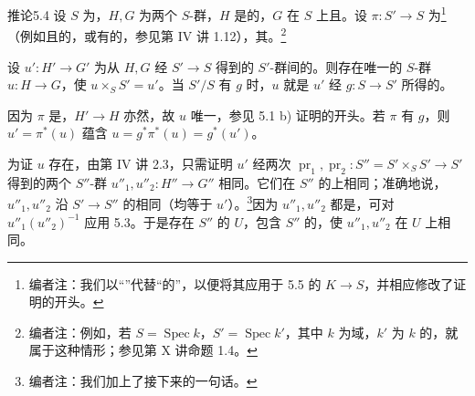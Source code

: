 \begin{SGAresult}{推论}{5.4}
设 $S$ 为，$H,G$ 为两个 $S$-群，$H$ 是的，$G$ 在 $S$ 上且。设 $\pi:S'\to S$ 为\footnote{编者注：我们以“”代替“的”，以便将其应用于 5.5 的 $K\to S$，并相应修改了证明的开头。}（例如且的，或有的，参见第 IV 讲 1.12），其。\footnote{编者注：例如，若 $S=\operatorname{Spec}k$，$S'=\operatorname{Spec}k'$，其中 $k$ 为域，$k'$ 为 $k$ 的，就属于这种情形；参见第 X 讲命题 1.4。}

设 $u':H'\to G'$ 为从 $H,G$ 经 $S'\to S$ 得到的 $S'$-群间的。则存在唯一的 $S$-群 $u:H\to G$，使 $u\times_S S'=u'$。当 $S'/S$ 有 $g$ 时，$u$ 就是 $u'$ 经 $g:S\to S'$ 所得的。
\end{SGAresult}
因为 $\pi$ 是，$H'\to H$ 亦然，故 $u$ 唯一，参见 5.1 b) 证明的开头。若 $\pi$ 有 $g$，则 $u'=\pi^*(u)$ 蕴含 $u=g^*\pi^*(u)=g^*(u')$。

为证 $u$ 存在，由第 IV 讲 2.3，只需证明 $u'$ 经两次 $\operatorname{pr}_1,\operatorname{pr}_2:S''=S'\times_S S'\to S'$ 得到的两个 $S''$-群 $u''_1,u''_2:H''\to G''$ 相同。它们在 $S''$ 的上相同；准确地说，$u''_1,u''_2$ 沿 $S'\to S''$ 的相同（均等于 $u'$）。\footnote{编者注：我们加上了接下来的一句话。}因为 $u''_1,u''_2$ 都是，可对 $u''_1(u''_2)^{-1}$ 应用 5.3。于是存在 $S''$ 的 $U$，包含 $S''$ 的，使 $u''_1,u''_2$ 在 $U$ 上相同。

